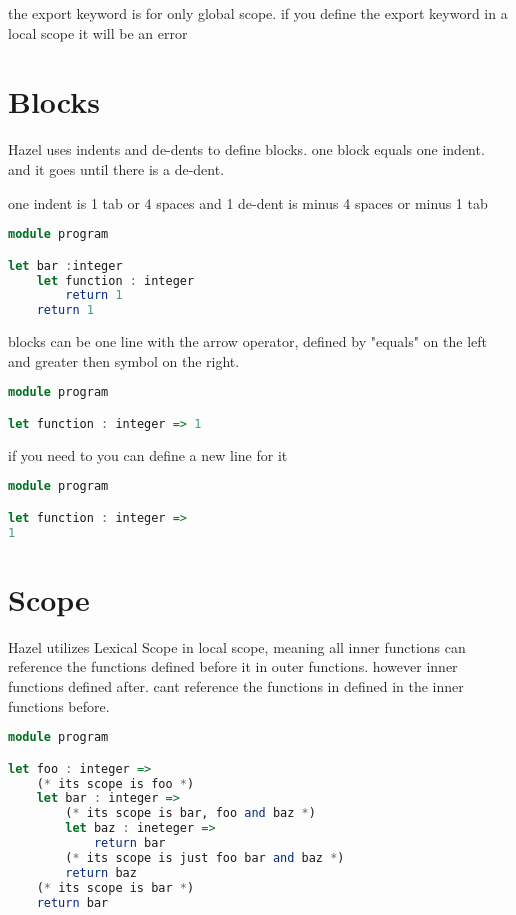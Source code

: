 \documentclass{article}
\begin{document}
the export keyword is for only global scope. if you define the export keyword in a local scope
it will be an error

\section{Blocks}

Hazel uses indents and de-dents to define blocks. one block equals one indent. and it goes until there is a de-dent.

one indent is 1 tab or 4 spaces and 1 de-dent is minus 4 spaces or minus 1 tab

\begin{lstlisting}[language=Haskell]
module program

let bar :integer
    let function : integer 
        return 1
    return 1 
\end{lstlisting}

blocks can be one line with the arrow operator, defined by "equals" on the left and greater then symbol on the right.

\begin{lstlisting}[language=Haskell]
module program

let function : integer => 1 
\end{lstlisting}

if you  need to you can define a new line for it 

\begin{lstlisting}[language=Haskell]
module program

let function : integer => 
1 
\end{lstlisting}


\section{Scope}

Hazel utilizes Lexical Scope in local scope, meaning all inner functions can reference the functions defined before it in outer functions. however inner functions defined after. cant reference the functions in defined in the inner functions before.

\begin{lstlisting}[language=Haskell]
module program

let foo : integer =>
    (* its scope is foo *) 
    let bar : integer =>
        (* its scope is bar, foo and baz *)
        let baz : ineteger => 
            return bar 
        (* its scope is just foo bar and baz *)
        return baz
    (* its scope is bar *)
    return bar
\end{lstlisting}
\end{document}
